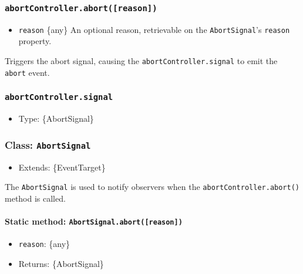 \subsubsection{\texorpdfstring{\texttt{abortController.abort({[}reason{]})}}{abortController.abort({[}reason{]})}}\label{abortcontroller.abortreason}

\begin{itemize}
\tightlist
\item
  \texttt{reason} \{any\} An optional reason, retrievable on the
  \texttt{AbortSignal}'s \texttt{reason} property.
\end{itemize}

Triggers the abort signal, causing the \texttt{abortController.signal}
to emit the \texttt{\textquotesingle{}abort\textquotesingle{}} event.

\subsubsection{\texorpdfstring{\texttt{abortController.signal}}{abortController.signal}}\label{abortcontroller.signal}

\begin{itemize}
\tightlist
\item
  Type: \{AbortSignal\}
\end{itemize}

\subsubsection{\texorpdfstring{Class:
\texttt{AbortSignal}}{Class: AbortSignal}}\label{class-abortsignal}

\begin{itemize}
\tightlist
\item
  Extends: \{EventTarget\}
\end{itemize}

The \texttt{AbortSignal} is used to notify observers when the
\texttt{abortController.abort()} method is called.

\paragraph{\texorpdfstring{Static method:
\texttt{AbortSignal.abort({[}reason{]})}}{Static method: AbortSignal.abort({[}reason{]})}}\label{static-method-abortsignal.abortreason}

\begin{itemize}
\tightlist
\item
  \texttt{reason}: \{any\}
\item
  Returns: \{AbortSignal\}
\end{itemize}

